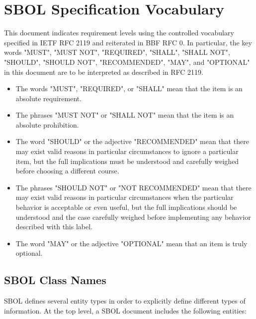 \section{SBOL Specification Vocabulary}

This document indicates requirement levels using the controlled vocabulary specified in IETF RFC 2119 and reiterated in BBF RFC 0.
In particular, the key words "MUST", "MUST NOT", "REQUIRED", "SHALL", "SHALL NOT", "SHOULD", "SHOULD NOT", "RECOMMENDED", "MAY", and "OPTIONAL" in this document are to be interpreted as described in RFC 2119.

\begin{itemize}
\item The words "MUST", "REQUIRED", or "SHALL" mean that the item is an absolute requirement.
\item The phrases "MUST NOT" or "SHALL NOT" mean that the item is an absolute prohibition.
\item The word "SHOULD" or the adjective "RECOMMENDED" mean that there may exist valid reasons in particular circumstances to ignore a particular item, but the full implications must be understood and carefully weighed before choosing a different course.
\item The phrases "SHOULD NOT" or "NOT RECOMMENDED" mean that there may exist valid reasons in particular circumstances when the particular behavior is acceptable or even useful, but the full implications should be understood and the case carefully weighed before implementing any behavior described with this label.
\item The word "MAY" or the adjective "OPTIONAL" mean that an item is truly optional.
\end{itemize}

\subsection{SBOL Class Names}

SBOL defines several entity types in order to explicitly define different types of information. At the top level, a SBOL document includes the following entities:

